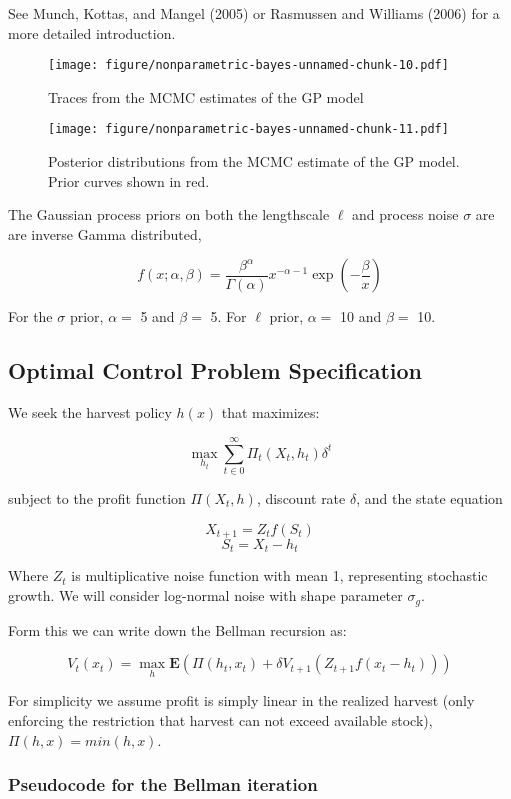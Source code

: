 \documentclass[author-year, review]{elsarticle} %
\makeatletter
\def\maxwidth{\ifdim\Gin@nat@width>\linewidth\linewidth
\else\Gin@nat@width\fi}
\let\Oldincludegraphics\includegraphics
\renewcommand{\includegraphics}[1]{\Oldincludegraphics[width=\maxwidth]{#1}}
\makeatother
\begin{document}
See Munch, Kottas, and Mangel (2005) or Rasmussen and Williams (2006)
for a more detailed introduction.

\begin{figure}[htbp]
\centering
\texttt{[image: figure/nonparametric-bayes-unnamed-chunk-10.pdf]}
\caption{Traces from the MCMC estimates of the GP model}
\end{figure}

\begin{figure}[htbp]
\centering
\texttt{[image: figure/nonparametric-bayes-unnamed-chunk-11.pdf]}
\caption{Posterior distributions from the MCMC estimate of the GP model.
Prior curves shown in red.}
\end{figure}

The Gaussian process priors on both the lengthscale $\ell$ and process
noise $\sigma$ are are inverse Gamma distributed,

\[f(x; \alpha, \beta) = \frac{\beta^\alpha}{\Gamma(\alpha)} x^{-\alpha - 1}\exp\left(-\frac{\beta}{x}\right)\]

For the $\sigma$ prior, $\alpha = $ 5 and $\beta = $ 5. For $\ell$
prior, $\alpha = $ 10 and $\beta = $ 10.

\subsection{Optimal Control Problem
Specification}\label{optimal-control-problem-specification}

We seek the harvest policy $h(x)$ that maximizes:

\[ \max_{h_t} \sum_{t \in 0}^{\infty}  \Pi_t(X_t, h_t) \delta^t  \]

subject to the profit function $\Pi(X_t,h)$, discount rate $\delta$, and
the state equation

\[X_{t+1} = Z_t f(S_t)  \] \[S_t = X_t - h_t \]

Where $Z_t$ is multiplicative noise function with mean 1, representing
stochastic growth. We will consider log-normal noise with shape
parameter $\sigma_g$.

Form this we can write down the Bellman recursion as:

\[V_t(x_t) = \max_h \mathbf{E} \left(\Pi(h_t, x_t) + \delta V_{t+1}( Z_{t+1} f(x_t - h_t)) \right)\]

For simplicity we assume profit is simply linear in the realized harvest
(only enforcing the restriction that harvest can not exceed available
stock), $\Pi(h,x) = min(h,x)$.

\subsubsection{Pseudocode for the Bellman
iteration}\label{pseudocode-for-the-bellman-iteration}
\end{document}

